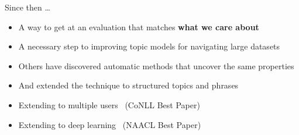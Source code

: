 \documentclass[compress]{beamer}
\begin{document}
\begin{frame}{Since then \dots}

  \begin{itemize}
    \item A way to get at an evaluation that matches {\bf what we care about}
    \item A necessary step to improving topic models for navigating large datasets~\cite{talley-11}
    \item Others have discovered automatic methods that uncover the same properties~\cite{newman-10,mimno-11}
    \item And extended the technique to structured topics and
      phrases~\cite{lindsey-12,weninger-12}
    \item \alert<2>{Extending to multiple users}~\cite{Felt-15}
      \ifjobtalk (CoNLL Best Paper) \fi
    \item \alert<2>{Extending to deep learning}~\cite{iyyer-16}
      \ifjobtalk (NAACL Best Paper) \fi
  \end{itemize}

\end{frame}
\end{document}
